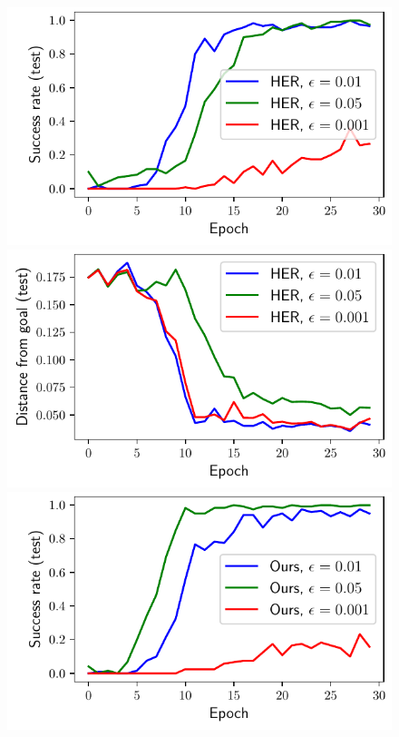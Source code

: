 %
\begin{figure}%
  \def\frac{0.24}
  \includegraphics[width=\frac\columnwidth]{media/res/ablate-ddpg-dqst-low_tresh_chosen-low_thresh_alt-ddpg/0.05-be0910cepoch-test/success_rate.pdf}%
  \includegraphics[width=\frac\columnwidth]{media/res/ablate-ddpg-dqst-low_tresh_chosen-low_thresh_alt-ddpg/0.05-be0910cepoch-test/ag_g_dist.pdf}%
  \includegraphics[width=\frac\columnwidth]{media/res/ablate-ddpg-dqst-low_tresh_chosen-low_thresh_alt-dqst/0.001-FetchPushPR-be467dfepoch-test/success_rate.pdf}%

\end{figure}
